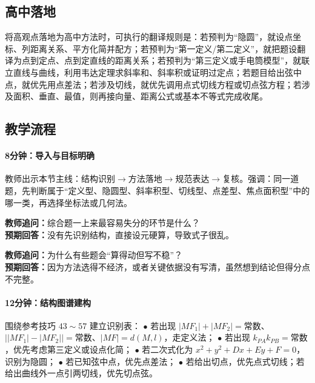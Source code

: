 \documentclass[UTF8,a4paper,11pt]{ctexart}
\begin{document}
\subsection*{高中落地}

将高观点落地为高中方法时，可执行的翻译规则是：若预判为“隐圆”，就设点坐标、列距离关系、平方化简并配方；若预判为“第一定义/第二定义”，就把题设翻译为点到定点、点到定直线的距离关系；若预判为“第三定义或手电筒模型”，就联立直线与曲线，利用韦达定理求斜率和、斜率积或证明过定点；若题目给出弦中点，就优先用点差法；若涉及切线，就优先调用点式切线方程或切点弦方程；若涉及面积、垂直、最值，则再接向量、距离公式或基本不等式完成收尾。

\subsection*{教学流程}

\paragraph{8分钟：导入与目标明确}

教师出示本节主线：$\text{结构识别}\rightarrow\text{方法落地}\rightarrow\text{规范表达}\rightarrow\text{复核}$。强调：同一道题，先判断属于“定义型、隐圆型、斜率积型、切线型、点差型、焦点面积型”中的哪一类，再选择坐标法或几何法。

\noindent\textbf{教师追问：}综合题一上来最容易失分的环节是什么？\\

\textbf{预期回答：}没有先识别结构，直接设元硬算，导致式子很乱。\par

\noindent\textbf{教师追问：}为什么有些题会“算得动但写不稳”？\\

\textbf{预期回答：}因为方法选得不经济，或者关键依据没有写清，虽然想到结论但得分点不完整。\par

\paragraph{12分钟：结构图谱建构}

围绕参考技巧 $43\sim57$ 建立识别表：
$\bullet$ 若出现 $|MF_1|+|MF_2|=\text{常数}$、$\bigl||MF_1|-|MF_2|\bigr|=\text{常数}$、$|MF|=d(M,l)$，走定义法；
$\bullet$ 若出现 $k_{PA}k_{PB}=\text{常数}$，优先考虑第三定义或设点化简；
$\bullet$ 若二次式化为 $x^2+y^2+Dx+Ey+F=0$，识别为隐圆；
$\bullet$ 若已知弦中点，优先点差法；
$\bullet$ 若给出切点，优先点式切线；若给出曲线外一点引两切线，优先切点弦。
\end{document}
